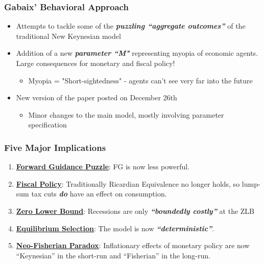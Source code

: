 \documentclass{beamer}
\begin{document}
\begin{frame}
	\frametitle{Gabaix' Behavioral Approach}
	\begin{itemize}
		\item Attempts to tackle some of the \textit{\textbf{puzzling ``aggregate outcomes''}} of the traditional New Keynesian model
		\vspace{8pt}
		\item Addition of a new \textit{\textbf{parameter ``M"}} representing myopia of economic agents. Large consequences for monetary and fiscal policy!
		\vspace{8pt}
		\begin{itemize}
			\item Myopia = "Short-sightedness" - agents can't see very far into the future
		\end{itemize}
		\vspace{5pt}
		\item New version of the paper posted on December 26th
		\begin{itemize}
			\item Minor changes to the main model, mostly involving parameter specification
		\end{itemize}
	\end{itemize}
\end{frame}


\begin{frame}
	\frametitle{Five Major Implications}
	\begin{enumerate}
		\item \textbf{\underline{Forward Guidance Puzzle}}: FG is now less powerful.
		\vspace{5pt}
		\item \textbf{\underline{Fiscal Policy}}: Traditionally Ricardian Equivalence no longer holds, so lump-sum tax cuts \textit{\textbf{do}} have an effect on consumption.
		\vspace{5pt}
		\item \textbf{\underline{Zero Lower Bound}}: Recessions are only  \textit{\textbf{``boundedly costly''}} at the ZLB
		\vspace{5pt}
		\item \textbf{\underline{Equilibrium Selection}}: The model is now \textit{\textbf{``deterministic''}}.
		\vspace{5pt}
		\item \underline{\textbf{Neo-Fisherian Paradox}}: Inflationary effects of monetary policy are now ``Keynesian'' in the short-run and ``Fisherian'' in the long-run.
	\end{enumerate}
\end{frame}
\end{document}
